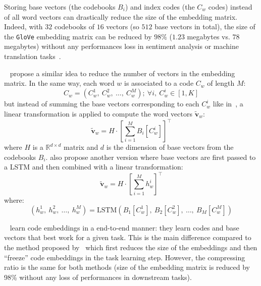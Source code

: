     \noindent Storing base vectors (the codebooks $B_i$) and index codes (the
    $C_w$ codes) instead of all word vectors can drastically reduce the size of
    the embedding matrix. Indeed, with $32$ codebooks of $16$ vectors (so $512$
    base vectors in total), the size of the \texttt{GloVe} embedding matrix can
    be reduced by $98\%$ ($1.23$ megabytes vs. $78$ megabytes) without any
    performances loss in sentiment analysis or machine translation
    tasks~\citep{shu2018compressing}.\medskip

    \citeauthor{chen2018kway}~\citep{chen2018kway} propose a similar idea to
    reduce the number of vectors in the embedding matrix. In the same way, each
    word $w$ is associated to a code $C_w$ of length $M$:
    \begin{equation}
      C_w = (C^1_w,~C^2_w,~\dots,~C^M_w); ~\forall i, ~ C^i_w \in [1, K]
    \end{equation}
    but instead of summing the base vectors corresponding to each $C^i_w$
    like in~\citet{shu2018compressing}, a linear transformation is applied to
    compute the word vectors $\widetilde{\mathbf{v}}_w$:
    \begin{equation}
      \widetilde{\mathbf{v}}_w = H \cdot
                                 \left[ \sum_{i=1}^M B_i[C^i_w]\right]^\top
    \end{equation}
    where $H$ is a $\mathbb{R}^{d \times d}$ matrix and $d$ is the
    dimension of base vectors from the codebooks $B_i$. \citet{chen2018kway}
    also propose another version where base vectors are first passed to a
    LSTM and then combined with a linear transformation:
    \begin{equation}
      \widetilde{\mathbf{v}}_w = H \cdot
                                 \left[ \sum_{i=1}^M h^i_w \right]^\top
    \end{equation}
    where:
    \begin{equation}
      (h^1_w,~h^2_w,~\dots,~h^M_w) = \mathrm{LSTM}(B_1[C^1_w],~B_2[C^2_w],
                                        ~\dots,~B_M[C^M_w] )
    \end{equation}
    \medskip

    \noindent \citeauthor{chen2018kway}~\citep{chen2018kway} learn code
    embeddings in a end-to-end manner: they learn codes and base vectors that
    best work for a given task. This is the main difference compared to the
    method proposed by~\citet{shu2018compressing} which first reduces the size
    of the embeddings and then ``freeze'' code embeddings in the task learning
    step. However, the compressing ratio is the same for both methods (size of
    the embedding matrix is reduced by 98\% without any loss of performances in
    downstream tasks).

